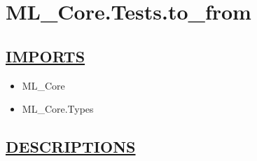 \chapter*{ML\_Core.Tests.to\_from}
\hypertarget{ecldoc:toc:ML_Core.Tests.to_from}{}

\section*{\underline{IMPORTS}}
\begin{itemize}
\item ML\_Core
\item ML\_Core.Types
\end{itemize}

\section*{\underline{DESCRIPTIONS}}
